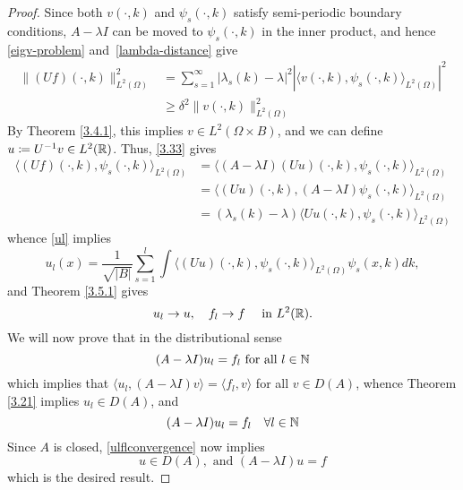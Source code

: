 \begin{theorem}
\begin{proof}
		Since both $v(\cdot, k)$ and $\psi_{s}(\cdot, k)$ satisfy semi-periodic boundary conditions, $A - \lambda I$ can be moved to $\psi_{s}(\cdot, k)$ in the inner product, and hence \eqref{eigv-problem} and \eqref{lambda-distance} give
		\begin{align*}
			\| (Uf)(\cdot,k)\|^{2}_{L^{2}(\Omega)} & = \sum_{s=1}^{\infty} |\lambda_{s}(k) - \lambda|^{2} |\langle v(\cdot, k), \psi_{s}(\cdot, k)\rangle_{L^{2}(\Omega)}|^{2} \\
			& \geq \delta^{2} \| v(\cdot, k)\|^{2}_{L^{2}(\Omega)}
		\end{align*}
		By Theorem \ref{3.4.1}, this implies $v \in L^{2}(\Omega \times B)$, and we can define $u \coloneqq U^{-1} v \in L^{2}(\mathbb{R})$. Thus, \eqref{3.33} gives
			\begin{align*}
				\langle (Uf)(\cdot, k), \psi_{s}(\cdot, k) \rangle_{L^{2}(\Omega)} & = \langle (A - \lambda I)(Uu)(\cdot, k), \psi_{s}(\cdot, k) \rangle_{L^{2}(\Omega)} \\
					& = \langle (Uu)(\cdot,k), (A - \lambda I) \psi_{s}(\cdot, k) \rangle_{L^{2}(\Omega)} \\
					& = (\lambda_{s}(k) - \lambda) \langle Uu(\cdot, k), \psi_{s}(\cdot, k) \rangle_{L^{2}(\Omega)}
			\end{align*}
		whence \eqref{ul} implies
			\[ u_{l}(x) = \frac{1}{\sqrt{|B|}} \sum_{s=1}^{l} \int \langle (Uu)(\cdot, k), \psi_{s}(\cdot, k)\rangle_{L^{2}(\Omega)} \psi_{s}(x, k) dk, \]
		and Theorem \ref{3.5.1} gives
			\begin{equation}
				u_{l} \rightarrow u, \quad f_{l} \rightarrow f \quad \text{ in } L^{2}(\mathbb{R}). \label{ulflconvergence}
			\end{equation}
		We will now prove that in the distributional sense 
			\begin{equation}
				(A - \lambda I) u_{l} = f_{l} \text{ for all } l \in \mathbb{N} \label{lefttoprove}
			\end{equation} 
		which implies that $\langle u_{l}, (A - \lambda I) v \rangle = \langle f_{l}, v\rangle$ for all $v \in D(A)$, whence Theorem \ref{3.21} implies $u_{l} \in D(A)$, and
			\[ (A - \lambda I) u_{l} = f_{l} \quad \forall l \in \mathbb{N} \]
		Since $A$ is closed, \eqref{ulflconvergence} now implies
			\[ u \in D(A), \text{ and } (A - \lambda I) u = f \]
		which is the desired result.
		

\end{proof}
\end{theorem}
